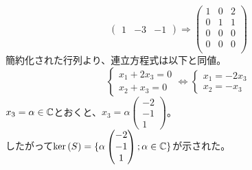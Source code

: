 \documentclass[dvipdfmx]{jsreport}
\begin{document}
\begin{souanswer}
\begin{enumerate}
\begin{enumerate_alpha}
\begin{equation*}
\begin{pmatrix}
    1& -3& -1
\end{pmatrix}\Rightarrow
\begin{pmatrix}
    1& 0& 2\\
    0& 1& 1\\
    0& 0 &0\\
    0& 0 &0\\
\end{pmatrix}
\end{equation*}
    簡約化された行列より、連立方程式は以下と同値。
\begin{equation*}
\begin{cases}
    x_1+ 2x_3= 0\\
    x_2+ x_3= 0
\end{cases}
    \iff
\begin{cases}
    x_1= -2x_3\\
    x_2= -x_3
\end{cases}
\end{equation*}
    $x_3= \alpha\in \mathbb{C}$とおくと、$x_3= \alpha\begin{pmatrix}-2\\ -1\\ 1\end{pmatrix}$。\\
    したがって$\ker{(S)}= \{\alpha\begin{pmatrix}-2\\ -1\\ 1\end{pmatrix}; \alpha\in \mathbb{C}\}$が示された。
    

\end{enumerate_alpha}
\end{enumerate}
\end{souanswer}
\end{document}
